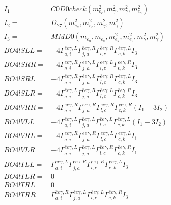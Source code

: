 \documentclass[A4,landscape]{article}
\begin{document}
\begin{align} 
I_1 = & C0D0check(m^2_{e_{{c}}}, m^2_{\gamma}, m^2_{\gamma}, m^2_{e_{{a}}}) \\ 
I_2 = & D_{27}(m^2_{e_{{a}}}, m^2_{e_{{c}}}, m^2_{\gamma}, m^2_{\gamma}) \\ 
I_3 = & MMD0(m_{e_{{a}}}, m_{e_{{c}}}, m^2_{e_{{a}}}, m^2_{e_{{c}}}, m^2_{\gamma}, m^2_{\gamma}) \\ 
  BO4lSLL= & -4  \Gamma^{\bar{e}e \gamma ,L}_{a, i} \Gamma^{\bar{e}e \gamma ,R}_{j, a} \Gamma^{\bar{e}e \gamma ,R}_{l, c} \Gamma^{\bar{e}e \gamma ,L}_{c, k} I_3 \\ 
  BO4lSRR= & -4  \Gamma^{\bar{e}e \gamma ,R}_{a, i} \Gamma^{\bar{e}e \gamma ,L}_{j, a} \Gamma^{\bar{e}e \gamma ,L}_{l, c} \Gamma^{\bar{e}e \gamma ,R}_{c, k} I_3 \\ 
  BO4lSRL= & -4  \Gamma^{\bar{e}e \gamma ,R}_{a, i} \Gamma^{\bar{e}e \gamma ,L}_{j, a} \Gamma^{\bar{e}e \gamma ,R}_{l, c} \Gamma^{\bar{e}e \gamma ,L}_{c, k} I_3 \\ 
  BO4lSLR= & -4  \Gamma^{\bar{e}e \gamma ,L}_{a, i} \Gamma^{\bar{e}e \gamma ,R}_{j, a} \Gamma^{\bar{e}e \gamma ,L}_{l, c} \Gamma^{\bar{e}e \gamma ,R}_{c, k} I_3 \\ 
  BO4lVRR= & -4  \Gamma^{\bar{e}e \gamma ,R}_{a, i} \Gamma^{\bar{e}e \gamma ,R}_{j, a} \Gamma^{\bar{e}e \gamma ,R}_{l, c} \Gamma^{\bar{e}e \gamma ,R}_{c, k} (I_1 - 3 I_2) \\ 
  BO4lVLL= & -4  \Gamma^{\bar{e}e \gamma ,L}_{a, i} \Gamma^{\bar{e}e \gamma ,L}_{j, a} \Gamma^{\bar{e}e \gamma ,L}_{l, c} \Gamma^{\bar{e}e \gamma ,L}_{c, k} (I_1 - 3 I_2) \\ 
  BO4lVRL= & -4  \Gamma^{\bar{e}e \gamma ,R}_{a, i} \Gamma^{\bar{e}e \gamma ,R}_{j, a} \Gamma^{\bar{e}e \gamma ,L}_{l, c} \Gamma^{\bar{e}e \gamma ,L}_{c, k} I_1 \\ 
  BO4lVLR= & -4  \Gamma^{\bar{e}e \gamma ,L}_{a, i} \Gamma^{\bar{e}e \gamma ,L}_{j, a} \Gamma^{\bar{e}e \gamma ,R}_{l, c} \Gamma^{\bar{e}e \gamma ,R}_{c, k} I_1 \\ 
  BO4lTLL= &  \Gamma^{\bar{e}e \gamma ,L}_{a, i} \Gamma^{\bar{e}e \gamma ,R}_{j, a} \Gamma^{\bar{e}e \gamma ,R}_{l, c} \Gamma^{\bar{e}e \gamma ,L}_{c, k} I_3 \\ 
  BO4lTLR= & 0 \\ 
  BO4lTRL= & 0 \\ 
  BO4lTRR= &  \Gamma^{\bar{e}e \gamma ,R}_{a, i} \Gamma^{\bar{e}e \gamma ,L}_{j, a} \Gamma^{\bar{e}e \gamma ,L}_{l, c} \Gamma^{\bar{e}e \gamma ,R}_{c, k} I_3 \\ 
\end{align} 
\end{document}
